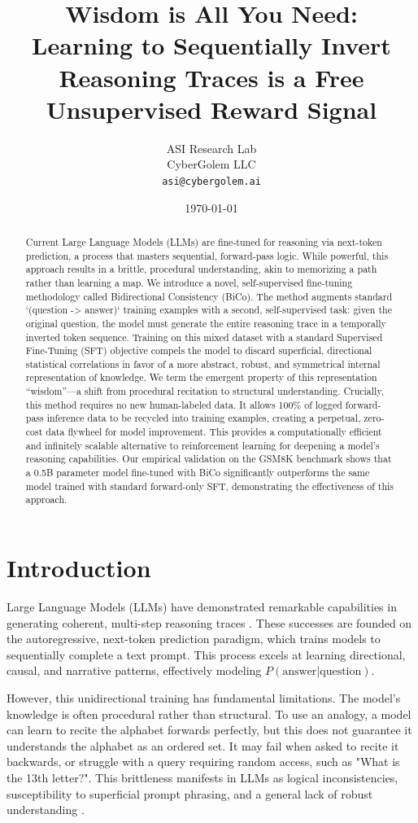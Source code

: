 \documentclass[11pt]{article}
\title{Wisdom is All You Need: \\ Learning to Sequentially Invert Reasoning Traces is a Free Unsupervised Reward Signal}
\author{ASI Research Lab\\
CyberGolem LLC\\
\texttt{asi@cybergolem.ai}}
\date{\today}
\begin{document}
\maketitle
\begin{abstract}
Current Large Language Models (LLMs) are fine-tuned for reasoning via next-token prediction, a process that masters sequential, forward-pass logic. While powerful, this approach results in a brittle, procedural understanding, akin to memorizing a path rather than learning a map. We introduce a novel, self-supervised fine-tuning methodology called Bidirectional Consistency (BiCo). The method augments standard `(question -> answer)` training examples with a second, self-supervised task: given the original question, the model must generate the entire reasoning trace in a temporally inverted token sequence. Training on this mixed dataset with a standard Supervised Fine-Tuning (SFT) objective compels the model to discard superficial, directional statistical correlations in favor of a more abstract, robust, and symmetrical internal representation of knowledge. We term the emergent property of this representation ``wisdom''—a shift from procedural recitation to structural understanding. Crucially, this method requires no new human-labeled data. It allows 100\% of logged forward-pass inference data to be recycled into training examples, creating a perpetual, zero-cost data flywheel for model improvement. This provides a computationally efficient and infinitely scalable alternative to reinforcement learning for deepening a model's reasoning capabilities. Our empirical validation on the GSM8K benchmark shows that a 0.5B parameter model fine-tuned with BiCo significantly outperforms the same model trained with standard forward-only SFT, demonstrating the effectiveness of this approach.
\end{abstract}

\section{Introduction}
Large Language Models (LLMs) have demonstrated remarkable capabilities in generating coherent, multi-step reasoning traces \cite{wei2022chain}. These successes are founded on the autoregressive, next-token prediction paradigm, which trains models to sequentially complete a text prompt. This process excels at learning directional, causal, and narrative patterns, effectively modeling $P(\text{answer}|\text{question})$.

However, this unidirectional training has fundamental limitations. The model's knowledge is often procedural rather than structural. To use an analogy, a model can learn to recite the alphabet forwards perfectly, but this does not guarantee it understands the alphabet as an ordered set. It may fail when asked to recite it backwards, or struggle with a query requiring random access, such as "What is the 13th letter?". This brittleness manifests in LLMs as logical inconsistencies, susceptibility to superficial prompt phrasing, and a general lack of robust understanding \cite{zhang2023siren}.
\end{document}

